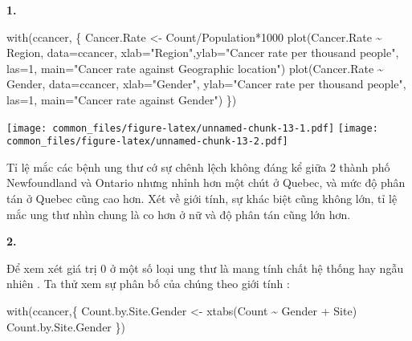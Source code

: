 \documentclass[
]{article}
\newenvironment{Shaded}{\begin{snugshade}}{\end{snugshade}}
\newcommand{\AttributeTok}[1]{\textcolor[rgb]{0.77,0.63,0.00}{#1}}
\newcommand{\DecValTok}[1]{\textcolor[rgb]{0.00,0.00,0.81}{#1}}
\newcommand{\FunctionTok}[1]{\textcolor[rgb]{0.00,0.00,0.00}{#1}}
\newcommand{\NormalTok}[1]{#1}
\newcommand{\OtherTok}[1]{\textcolor[rgb]{0.56,0.35,0.01}{#1}}
\newcommand{\SpecialCharTok}[1]{\textcolor[rgb]{0.00,0.00,0.00}{#1}}
\newcommand{\StringTok}[1]{\textcolor[rgb]{0.31,0.60,0.02}{#1}}
\begin{document}
\textbf{1.}

\begin{Shaded}
\begin{Highlighting}[]
\FunctionTok{with}\NormalTok{(ccancer, \{}
\NormalTok{  Cancer.Rate }\OtherTok{\textless{}{-}}\NormalTok{ Count}\SpecialCharTok{/}\NormalTok{Population}\SpecialCharTok{*}\DecValTok{1000}
  \FunctionTok{plot}\NormalTok{(Cancer.Rate }\SpecialCharTok{\textasciitilde{}}\NormalTok{ Region, }\AttributeTok{data=}\NormalTok{ccancer, }\AttributeTok{xlab=}\StringTok{"Region"}\NormalTok{,}\AttributeTok{ylab=}\StringTok{"Cancer rate per thousand people"}\NormalTok{, }\AttributeTok{las=}\DecValTok{1}\NormalTok{, }\AttributeTok{main=}\StringTok{"Cancer rate against Geographic location"}\NormalTok{)}
  \FunctionTok{plot}\NormalTok{(Cancer.Rate }\SpecialCharTok{\textasciitilde{}}\NormalTok{ Gender, }\AttributeTok{data=}\NormalTok{ccancer, }\AttributeTok{xlab=}\StringTok{"Gender"}\NormalTok{, }\AttributeTok{ylab=}\StringTok{"Cancer rate per thousand people"}\NormalTok{, }\AttributeTok{las=}\DecValTok{1}\NormalTok{, }\AttributeTok{main=}\StringTok{"Cancer rate against Gender"}\NormalTok{)}
\NormalTok{\})}
\end{Highlighting}
\end{Shaded}

\texttt{[image: common\_files/figure-latex/unnamed-chunk-13-1.pdf]}
\texttt{[image: common\_files/figure-latex/unnamed-chunk-13-2.pdf]}

Tỉ lệ mắc các bệnh ung thư cớ sự chênh lệch không đáng kể giữa 2 thành
phố Newfoundland và Ontario nhưng nhỉnh hơn một chút ở Quebec, và mức độ
phân tán ở Quebec cũng cao hơn. Xét về giới tính, sự khác biệt cũng
không lớn, tỉ lệ mắc ung thư nhìn chung là co hơn ở nữ và độ phân tán
cũng lớn hơn.

\textbf{2.}

Để xem xét giá trị 0 ở một số loại ung thư là mang tính chất hệ thống
hay ngẫu nhiên . Ta thử xem sự phân bố của chúng theo giới tính :

\begin{Shaded}
\begin{Highlighting}[]
\FunctionTok{with}\NormalTok{(ccancer,\{}
\NormalTok{  Count.by.Site.Gender }\OtherTok{\textless{}{-}} \FunctionTok{xtabs}\NormalTok{(Count }\SpecialCharTok{\textasciitilde{}}\NormalTok{ Gender }\SpecialCharTok{+}\NormalTok{ Site)}
\NormalTok{  Count.by.Site.Gender}
\NormalTok{\})}
\end{Highlighting}
\end{Shaded}
\end{document}
